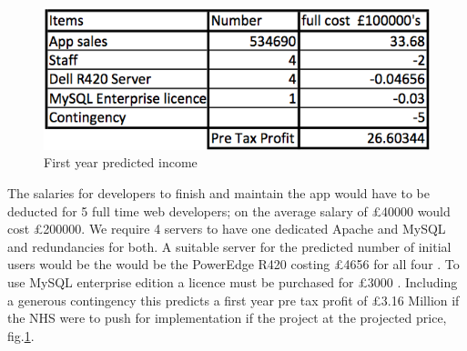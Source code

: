 \documentclass[11pt]{article}
\begin{document}
\begin{figure}
\centering
\includegraphics[scale=0.4]{costing.png}
\caption{First year predicted income \label{costing}} 
\end{figure}
The salaries for developers to finish and maintain the app would have to be deducted for 5 full time web developers; on the average salary of \pounds 40000 \cite{salary} would cost \pounds 200000. We require 4 servers to have one dedicated Apache and MySQL and redundancies for both. A suitable server for the predicted number of initial users would be the  would be the PowerEdge R420 costing \pounds4656 for all four \cite{dell}. To use MySQL enterprise edition a licence must be purchased for \pounds3000 \cite{MySQL}. Including a generous contingency this predicts a first year pre tax profit of \pounds3.16 Million if the NHS were to push for implementation if the project at the projected price, fig.\ref{costing}.

%
%
\end{document}
